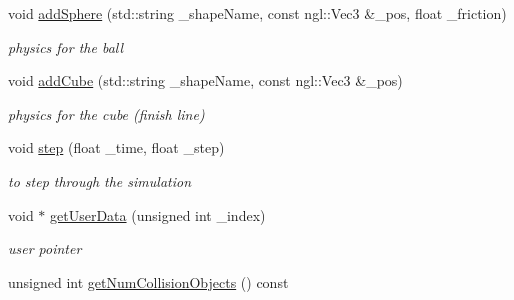 \begin{DoxyCompactItemize}
void \hyperlink{classPhysicsWorld_ad5e2e567a83e27977fa57185640efea5}{addSphere} (std::string \_\-shapeName, const ngl::Vec3 \&\_\-pos, float \_\-friction)
\begin{DoxyCompactList}\small\item\em physics for the ball \item\end{DoxyCompactList}\item 
void \hyperlink{classPhysicsWorld_a780e7dba95f82c55de457f4dc4f942ec}{addCube} (std::string \_\-shapeName, const ngl::Vec3 \&\_\-pos)
\begin{DoxyCompactList}\small\item\em physics for the cube (finish line) \item\end{DoxyCompactList}\item 
void \hyperlink{classPhysicsWorld_a7c77049c55dd34a22437e961dbcf92bc}{step} (float \_\-time, float \_\-step)
\begin{DoxyCompactList}\small\item\em to step through the simulation \item\end{DoxyCompactList}\item 
void $\ast$ \hyperlink{classPhysicsWorld_aa70cfe601f4ee449c385027899e37b74}{getUserData} (unsigned int \_\-index)
\begin{DoxyCompactList}\small\item\em user pointer \item\end{DoxyCompactList}\item 
\hypertarget{classPhysicsWorld_a23a2c8693eb25ad28e13b66e95a7c573}{
unsigned int \hyperlink{classPhysicsWorld_a23a2c8693eb25ad28e13b66e95a7c573}{getNumCollisionObjects} () const }
\label{classPhysicsWorld_a23a2c8693eb25ad28e13b66e95a7c573}


\end{DoxyCompactItemize}
